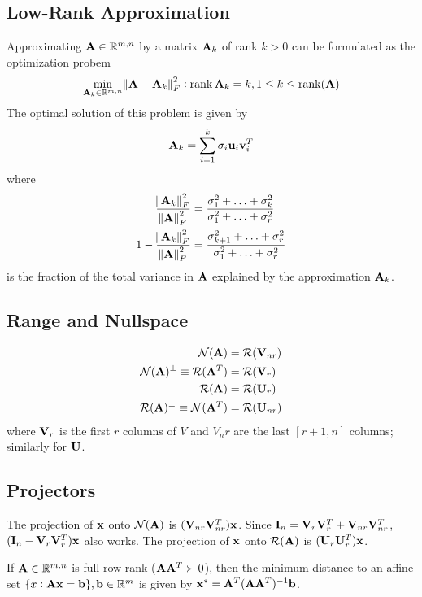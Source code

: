 \subsection*{Low-Rank Approximation}
Approximating $\mathbf{A}\in\mathbb{R}^{m,n}$ by a matrix $\mathbf{A}_k$ of rank $k>0$ can be formulated as the optimization probem
\begin{equation}
\min_{\mathbf{A}_k\in\mathbb{R}^{m,n}} \norm{\mathbf{A}-\mathbf{A}_k}_F^2: \operatorname{rank}{\mathbf{A}_k}=k, 1\le k \le \operatorname{rank}(\mathbf{A})
\end{equation}
The optimal solution of this problem is given by
\begin{equation}
\mathbf{A}_k=\sum_{i=1}^k \sigma_i \mathbf{u}_i \mathbf{v}_i^T
\end{equation}
where
\begin{align}
\frac{\norm{\mathbf{A}_k}_F^2}{\norm{\mathbf{A}}_F^2}&=\frac{\sigma_1^2+\ldots+\sigma_k^2}{\sigma_1^2+\ldots+\sigma_r^2} \\
1-\frac{\norm{\mathbf{A}_k}_F^2}{\norm{\mathbf{A}}_F^2}&=\frac{\sigma_{k+1}^2+\ldots+\sigma_r^2}{\sigma_1^2+\ldots+\sigma_r^2}
\end{align}
is the fraction of the total variance in $\mathbf{A}$ explained by the approximation $\mathbf{A}_k$.

\subsection*{Range and Nullspace}
\begin{align}
\mathcal{N}(\mathbf{A}) &= \mathcal{R}(\mathbf{V}_{nr})                      \\
\mathcal{N}(\mathbf{A})^\perp \equiv\mathcal{R}(\mathbf{A}^T)&=\mathcal{R}(\mathbf{V}_r) \\
\mathcal{R}(\mathbf{A})&=\mathcal{R}(\mathbf{U}_r)                        \\
\mathcal{R}(\mathbf{A})^\perp\equiv\mathcal{N}(\mathbf{A}^T)&=\mathcal{R}(\mathbf{U}_{nr})
\end{align}
where $\mathbf{V}_r$ is the first $r$ columns of $V$ and $V_nr$ are the last $[r+1,n]$ columns; similarly for $\mathbf{U}$.


\subsection*{Projectors}
The projection of $\mathbf{x}$ onto $\mathcal{N}(\mathbf{A})$ is $(\mathbf{V}_{nr}\mathbf{V}_{nr}^T)\mathbf{x}$. Since $\mathbf{I}_n=\mathbf{V}_r\mathbf{V}_r^T+\mathbf{V}_{nr}\mathbf{V}_{nr}^T$, $(\mathbf{I}_n-\mathbf{V}_{r}\mathbf{V}_{r}^T)\mathbf{x}$ also works. The projection of $\mathbf{x}$ onto $\mathcal{R}(\mathbf{A})$ is $(\mathbf{U}_r\mathbf{U}_r^T)\mathbf{x}$.

If $\mathbf{A}\in\mathbb{R}^{m,n}$ is full row rank ($\mathbf{A}\mathbf{A}^T\succ0$), then the minimum distance to an affine set $\{x:\mathbf{A}\mathbf{x}=\mathbf{b}\}, \mathbf{b}\in\mathbb{R}^{m}$ is given by $\mathbf{x}^*=\mathbf{A}^T(\mathbf{A}\mathbf{A}^T)^{-1}\mathbf{b}$. %

